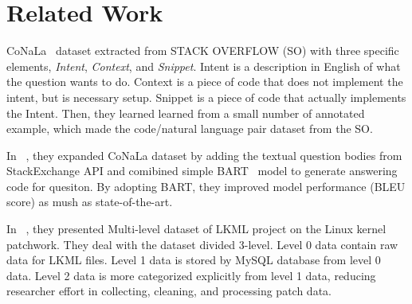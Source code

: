 \section{Related Work}
CoNaLa~\cite{yin2018mining} dataset extracted from STACK OVERFLOW (SO) with three
specific elements, \textit{Intent}, \textit{Context}, and \textit{Snippet}.
Intent is a description in English of what the question wants to do.
Context is a piece of code that does not implement the intent, but is necessary
setup. Snippet is a piece of code that actually implements the Intent. Then, they
learned learned from a small number of annotated example, which made the
code/natural language pair dataset from the SO.

In ~\cite{orlanski2021reading}, they expanded CoNaLa dataset by adding the textual question
bodies from StackExchange API and comibined simple BART~\cite{lewis2019bart}
model to generate answering code for quesiton. By adopting BART, they improved
model performance (BLEU score) as mush as state-of-the-art.

In ~\cite{xu2018kernelpatchwork},
they presented Multi-level
dataset of LKML project on the Linux kernel patchwork.
They deal with the dataset divided 3-level. Level 0 data contain raw data for
LKML files. Level 1 data is stored by
MySQL database from level 0 data. Level 2 data is more
categorized explicitly from level 1 data, reducing researcher effort in
collecting, cleaning, and processing patch data.
